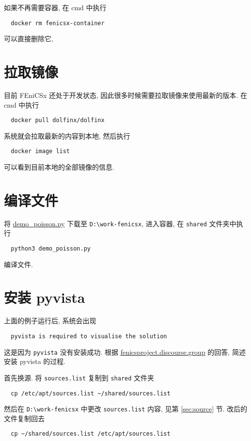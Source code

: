 \documentclass[fontset=founder]{ctexrep}
\begin{document}
如果不再需要容器,
在 \textsf{cmd} 中执行
\begin{lstlisting}
  docker rm fenicsx-container
\end{lstlisting}
可以直接删除它,

\section{拉取镜像}

目前 FEniCSx 还处于开发状态,
因此很多时候需要拉取镜像来使用最新的版本.
在 \textsf{cmd} 中执行
\begin{lstlisting}
  docker pull dolfinx/dolfinx
\end{lstlisting}
系统就会拉取最新的内容到本地,
然后执行
\begin{lstlisting}
  docker image list
\end{lstlisting}
可以看到目前本地的全部镜像的信息.

\section{编译文件}

将 \href{https://docs.fenicsproject.org/dolfinx/main/python/_downloads/b94ac7be61dc3726ca331afd20f195d2/demo_poisson.py}{demo\_poisson.py} 下载至 \texttt{D:\textbackslash work-fenicsx},
进入容器,
在 \texttt{shared} 文件夹中执行
\begin{lstlisting}
  python3 demo_poisson.py
\end{lstlisting}
编译文件.

\section{安装 pyvista}

上面的例子运行后,
系统会出现
\begin{lstlisting}
  pyvista is required to visualise the solution
\end{lstlisting}
这是因为 \texttt{pyvista} 没有安装成功.
根据 \href{https://fenicsproject.discourse.group/t/how-to-use-pyvista-in-docker-for-windows-10-user/6921}{fenicsproject.discourse.group} 的回答,
简述安装 pyvista 的过程.

首先换源.
将 \texttt{sources.list} 复制到 \texttt{shared} 文件夹
\begin{lstlisting}
  cp /etc/apt/sources.list ~/shared/sources.list
\end{lstlisting}
然后在 \texttt{D:\textbackslash work-fenicsx} 中更改 \texttt{sources.list} 内容,
见第 \ref{sec:source} 节.
改后的文件复制回去
\begin{lstlisting}
  cp ~/shared/sources.list /etc/apt/sources.list
\end{lstlisting}
\end{document}

